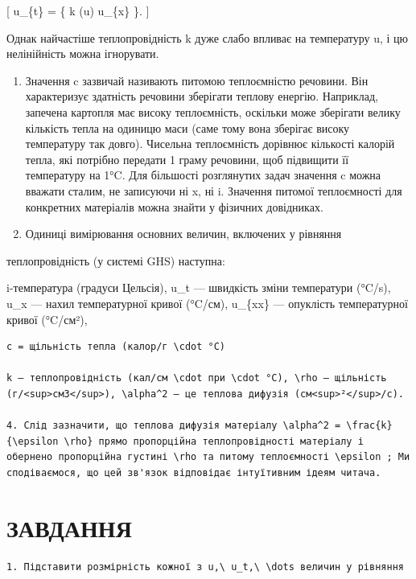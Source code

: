 \documentclass[
  ukrainian,
]{article}
\begin{document}
{[} u\_\{t\} =   \{ k (u)
\textbar{} u\_\{x\} \}. {]}

Однак найчастіше теплопровідність k дуже слабо впливає на температуру u,
і цю нелінійність можна ігнорувати.

\begin{enumerate}
\def\labelenumi{\arabic{enumi}.}
\setcounter{enumi}{1}
\item
  Значення c зазвичай називають питомою теплоємністю речовини. Він
  характеризує здатність речовини зберігати теплову енергію. Наприклад,
  запечена картопля має високу теплоємність, оскільки може зберігати
  велику кількість тепла на одиницю маси (саме тому вона зберігає високу
  температуру так довго). Чисельна теплоємність дорівнює кількості
  калорій тепла, які потрібно передати 1 граму речовини, щоб підвищити
  її температуру на 1°C. Для більшості розглянутих задач значення c
  можна вважати сталим, не записуючи ні x, ні i. Значення питомої
  теплоємності для конкретних матеріалів можна знайти у фізичних
  довідниках.
\item
  Одиниці вимірювання основних величин, включених у рівняння
\end{enumerate}

теплопровідність (у системі GHS) наступна:

i-температура (градуси Цельсія), u\_t --- швидкість зміни температури
(°C/s), u\_x --- нахил температурної кривої (°C/см), u\_\{xx\} ---
опуклість температурної кривої (°C/см²),

\begin{verbatim}
c = щільність тепла (калор/г \cdot °C)

k — теплопровідність (кал/см \cdot при \cdot °C), \rho — щільність (г/<sup>см3</sup>), \alpha^2 — це теплова дифузія (см<sup>²</sup>/с).

4. Слід зазначити, що теплова дифузія матеріалу \alpha^2 = \frac{k}{\epsilon \rho} прямо пропорційна теплопровідності матеріалу і обернено пропорційна густині \rho та питому теплоємності \epsilon ; Ми сподіваємося, що цей зв'язок відповідає інтуїтивним ідеям читача.
\end{verbatim}

\section{ЗАВДАННЯ}\label{ux437ux430ux432ux434ux430ux43dux43dux44f-2}

\begin{verbatim}
1. Підставити розмірність кожної з u,\ u_t,\ \dots величин у рівняння
\end{verbatim}
\end{document}
